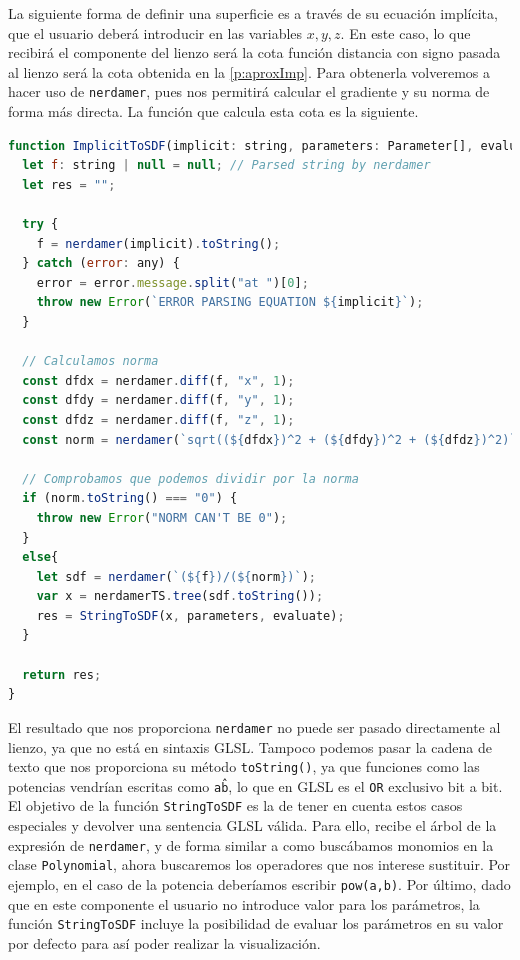 La siguiente forma de definir una superficie es a través de su ecuación implícita, que el usuario deberá introducir en las variables $x,y,z$. En este caso, lo que recibirá el componente del lienzo será la cota función distancia con signo pasada al lienzo será la cota obtenida en la \autoref{p:aproxImp}. Para obtenerla volveremos a hacer uso de \texttt{nerdamer}, pues nos permitirá calcular el gradiente y su norma de forma más directa. La función que calcula esta cota es la siguiente.
\begin{lstlisting}[language=JavaScript, caption=Obtención de cota de ecuación implícita]
function ImplicitToSDF(implicit: string, parameters: Parameter[], evaluate: boolean = false) : string{
  let f: string | null = null; // Parsed string by nerdamer
  let res = "";

  try {
    f = nerdamer(implicit).toString();
  } catch (error: any) {
    error = error.message.split("at ")[0];
    throw new Error(`ERROR PARSING EQUATION ${implicit}`);
  }

  // Calculamos norma
  const dfdx = nerdamer.diff(f, "x", 1);
  const dfdy = nerdamer.diff(f, "y", 1);
  const dfdz = nerdamer.diff(f, "z", 1);
  const norm = nerdamer(`sqrt((${dfdx})^2 + (${dfdy})^2 + (${dfdz})^2)`);

  // Comprobamos que podemos dividir por la norma
  if (norm.toString() === "0") {
    throw new Error("NORM CAN'T BE 0");
  }
  else{
    let sdf = nerdamer(`(${f})/(${norm})`);
    var x = nerdamerTS.tree(sdf.toString());
    res = StringToSDF(x, parameters, evaluate);
  }

  return res;
}
\end{lstlisting}
El resultado que nos proporciona \texttt{nerdamer} no puede ser pasado directamente al lienzo, ya que no está en sintaxis GLSL. Tampoco podemos pasar la cadena de texto que nos proporciona su método \texttt{toString()}, ya que funciones como las potencias vendrían escritas como \texttt{a\^b}, lo que en GLSL es el \texttt{OR} exclusivo bit a bit. El objetivo de la función \texttt{StringToSDF} es la de tener en cuenta estos casos especiales y devolver una sentencia GLSL válida. Para ello, recibe el árbol de la expresión de \texttt{nerdamer}, y de forma similar a como buscábamos monomios en la clase \texttt{Polynomial}, ahora buscaremos los operadores que nos interese sustituir. Por ejemplo, en el caso de la potencia deberíamos escribir \texttt{pow(a,b)}. Por último, dado que en este componente el usuario no introduce valor para los parámetros, la función \texttt{StringToSDF} incluye la posibilidad de evaluar los parámetros en su valor por defecto para así poder realizar la visualización.

